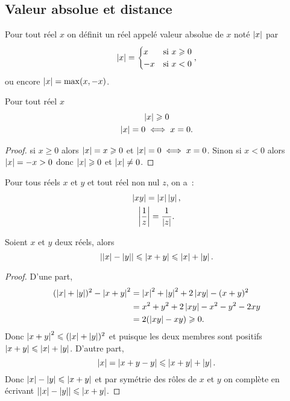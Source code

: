 \subsection{Valeur absolue et distance}

\begin{defdef}
  Pour tout réel \(x\) on définit un réel appelé valeur absolue de \(x\) noté \(\abs{x}\) par
  \begin{equation}
    \abs{x}=\begin{cases} x & \text{si } x\geqslant 0 \\ -x & \text{si } x<0\end{cases},
  \end{equation}
ou encore \(\abs{x}=\max(x,-x)\).
\end{defdef}
\begin{prop}
  Pour tout réel \(x\)
  \begin{gather}
    \abs{x}\geqslant 0 \\
    \abs{x}=0 \iff x=0.
  \end{gather}
\end{prop}
\begin{proof}
  si \(x\geqslant 0\) alors \(\abs{x}=x\geqslant 0\) et \(\abs{x}=0 \iff x=0\). Sinon si \(x<0\) alors \(\abs{x}=-x>0\) donc \(\abs{x}\geqslant 0\) et \(\abs{x}\neq 0\).
\end{proof}
\begin{prop}
  Pour tous réels \(x\) et \(y\) et tout réel non nul \(z\), on a~:
  \begin{gather}
    \abs{xy}=\abs{x}\abs{y}, \\ 
    \abs{\frac{1}{z}}=\frac{1}{\abs{z}}.
  \end{gather}
\end{prop}
\begin{prop}
  Soient \(x\) et \(y\) deux réels, alors
  \begin{equation}
    \abs{\abs{x}-\abs{y}}\leqslant \abs{x+y} \leqslant \abs{x}+\abs{y}.
  \end{equation}
\end{prop}
\begin{proof}
  D'une part,
  \begin{align}
    (\abs{x}+\abs{y})^2-\abs{x+y}^2 &=\abs{x}^2+\abs{y}^2+2\abs{xy}-(x+y)^2\\
    &=x^2+y^2+2\abs{xy}-x^2-y^2-2xy\\
    &=2(\abs{xy}-xy)\geqslant 0.
  \end{align}
Donc \(\abs{x+y}^2\leqslant (\abs{x}+\abs{y})^2\) et puisque les deux membres sont positifs \(\abs{x+y}\leqslant \abs{x}+\abs{y}\). D'autre part,
\begin{equation}
  \abs{x}=\abs{x+y-y}\leqslant \abs{x+y}+\abs{y}.
\end{equation}
Donc \(\abs{x}-\abs{y}\leqslant \abs{x+y}\) et par symétrie des rôles de \(x\) et \(y\) on complète en écrivant \(\abs{\abs{x}-\abs{y}}\leqslant \abs{x+y}\).
\end{proof}
